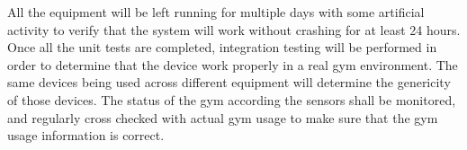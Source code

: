 \documentclass[PPFS.tex]{template/subfiles}
\begin{document}
All the equipment will be left running for multiple days with some artificial activity to verify that the system will work without crashing for at least 24 hours.
Once all the unit tests are completed, integration testing will be performed in order to determine that the device work properly in a real gym environment. The same devices being used across different equipment will determine the genericity of those devices. The status of the gym according the sensors shall be monitored, and regularly cross checked with actual gym usage to make sure that the gym usage information is correct. 
\end{document}
